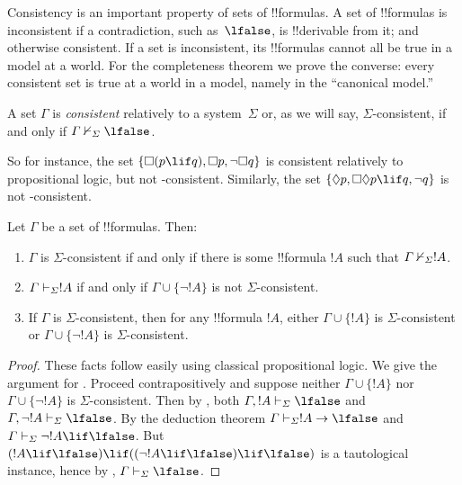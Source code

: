 \documentclass[../../../include/open-logic-section]{subfiles}
\begin{document}


Consistency is an important property of sets of !!{formula}s. A set of
!!{formula}s is inconsistent if a contradiction, such as~$\lfalse$, is
!!{derivable} from it; and otherwise consistent. If a set is
inconsistent, its !!{formula}s cannot all be true in a model at a
world. For the completeness theorem we prove the converse: every
consistent set is true at a world in a model, namely in the ``canonical
model.''

\begin{defn}
  A set $\Gamma$ is \emph{consistent} relatively to a system~$\Sigma$
  or, as we will say, $\Sigma$-consistent, if and only if $\Gamma
  \Proves/[\Sigma] \lfalse$.
\end{defn}

So for instance, the set $\{ \Box(p \lif q), \Box p, \lnot\Box q \}$ is
consistent relatively to propositional logic, but not
-consistent. Similarly, the set $\{ \Diamond p, \Box\Diamond
p \lif q, \lnot q \}$ is not -consistent.

\begin{prop}
  Let $\Gamma$ be a set of !!{formula}s. Then:
  \begin{enumerate}
  \item $\Gamma$ is $\Sigma$-consistent if and only if there is
    some !!{formula} $!A$ such that $\Gamma \Proves/[\Sigma]
    !A$.
  \item {}%
    $\Gamma \Proves[\Sigma] !A$ if and only if $\Gamma \cup \{
    \lnot!A \}$ is not $\Sigma$-consistent.
  \item {}%
    If $\Gamma$ is $\Sigma$-consistent, then for any !!{formula}
    $!A$, either $\Gamma \cup \{ !A \}$ is
    $\Sigma$-consistent or $\Gamma \cup \{ \lnot!A \}$ is
    $\Sigma$-consistent.
  \end{enumerate}
\end{prop}

\begin{proof}
  These facts follow easily using classical propositional logic. We
  give the argument for . Proceed
  contrapositively and suppose neither $\Gamma \cup \{ !A \}$ nor
  $\Gamma \cup \{ \lnot!A \}$ is $\Sigma$-consistent. Then by
  , both $\Gamma, !A \Proves[\Sigma]
  \lfalse$ and $\Gamma, \lnot !A \Proves[\Sigma] \lfalse$. By the
  deduction theorem $\Gamma \Proves[\Sigma] !A \to \lfalse$ and
  $\Gamma \Proves[\Sigma] \lnot!A \lif \lfalse$. But $(!A \lif
  \lfalse) \lif ((\lnot!A \lif \lfalse) \lif \lfalse)$ is a
  tautological instance, hence by
  ,
  $\Gamma \Proves[\Sigma] \lfalse$.
\end{proof}
\end{document}
